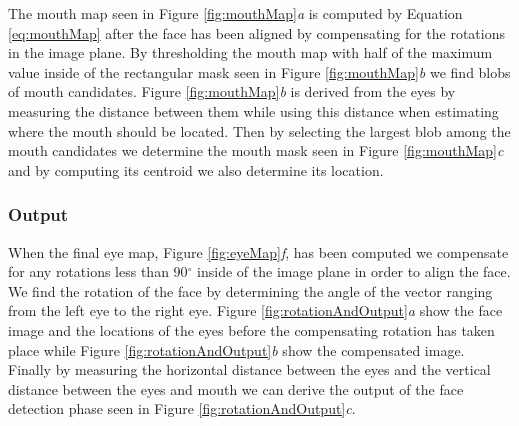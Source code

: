 The mouth map seen in Figure \ref{fig:mouthMap}\textit{a} is computed by 
Equation \ref{eq:mouthMap} after the face has been aligned by compensating for the rotations in the image plane. By thresholding the mouth map with half of the maximum value inside of the rectangular mask seen in Figure \ref{fig:mouthMap}\textit{b} we find blobs of mouth candidates. Figure \ref{fig:mouthMap}\textit{b} is derived from the eyes by measuring the distance between them while using this distance when estimating where the mouth should be located. Then by selecting the largest blob among the mouth candidates we determine the mouth mask seen in Figure \ref{fig:mouthMap}\textit{c} and by computing its centroid we also determine its location. 







\subsubsection{Output}

When the final eye map, Figure \ref{fig:eyeMap}\textit{f}, has been computed we compensate for any rotations less than 90$^{\circ}$ inside of the image plane in order to align the face. We find the rotation of the face by determining the angle of the vector ranging from the left eye to the right eye. Figure \ref{fig:rotationAndOutput}\textit{a} show the face image and the locations of the eyes before the compensating rotation has taken place while Figure \ref{fig:rotationAndOutput}\textit{b} show the compensated image. Finally by measuring the horizontal distance between the eyes and the vertical distance between the eyes and mouth we can derive the output of the face detection phase seen in Figure \ref{fig:rotationAndOutput}\textit{c}.

